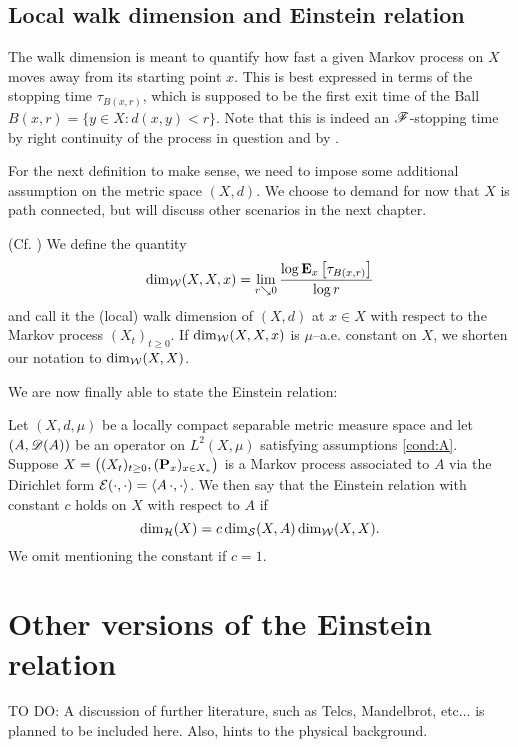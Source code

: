 \subsection{Local walk dimension and Einstein relation}

The walk dimension is meant to quantify how fast a given Markov process on $X$ moves away from its starting point $x$. This is best expressed in terms of the stopping time $\tau_{B(x,r)}$, which is supposed to be the first exit time of the Ball $B(x,r)=\{y\in X:d(x,y)<r\}$. Note that this is indeed an $\scF$-stopping time by right continuity of the process in question and by \cite[Lemma 7.6]{kallenberg2002foundations}.

For the next definition to make sense, we need to impose some additional assumption on the metric space $(X,d)$. We choose to demand for now that $X$ is path connected, but will discuss other scenarios in the next chapter. 
\begin{defin}\label{def:dimw}(Cf. \cite{hambly_kigami_kumagai_2002})
  We define the quantity
  \[
    \dimw(X,X,x)=\lim_{r\searrow0}\frac{\log \PTEp{\tau_{B(x,r)}}{x}}{\log r}
  \]
  and call it the (local) walk dimension of $(X,d)$ at $x\in X$ with respect to the Markov process $(X_t)_{t\geq0}$. If $\dimw(X,X,x)$ is $\mu$--a.e. constant on $X$, we shorten our notation to $\dimw(X,X)$.
\end{defin}
We are now finally able to state the Einstein relation: 
\begin{defin}
  Let $(X,d,\mu)$ be a locally compact separable metric measure space and let $(A,\scD(A))$ be an operator on $L^2(X,\mu)$ satisfying assumptions \ref{cond:A}. Suppose $X=\big((X_t)_{t\geq0},(\Prob_x)_{x\in X_*}\big)$ is a Markov process associated to $A$ via the Dirichlet form $\cE(\cdot,\cdot)=\left<A\,\cdot,\cdot\right>$. We then say that the Einstein relation with constant $c$ holds on $X$ with respect to $A$ if
  \begin{equation}\label{eq:ER}
    \dimh(X)=c\dims(X,A)\dimw(X,X).
  \end{equation}
  We omit mentioning the constant if $c=1$.
\end{defin}




\section{Other versions of the Einstein relation}

TO DO: A discussion of further literature, such as Telcs, Mandelbrot, etc... is planned to be included here. Also, hints to the physical background. 

